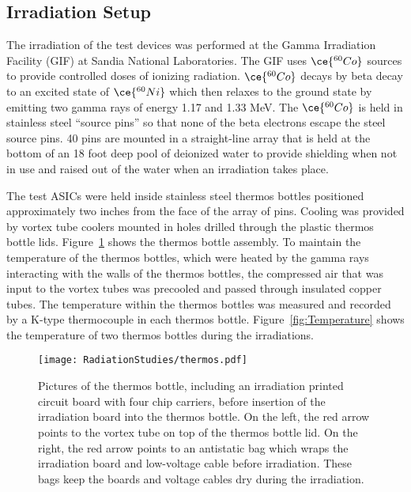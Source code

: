 \subsection{Irradiation Setup}

The irradiation of the test devices was performed at the Gamma Irradiation Facility (GIF) at Sandia National Laboratories.  The GIF uses $\ce{^{60}Co}$ sources to provide controlled doses of ionizing radiation. $\ce{^{60}Co}$ decays by beta decay to an excited state of $\ce{^{60}Ni}$ which then relaxes to the ground state by emitting two gamma rays of energy 1.17 and 1.33 MeV. The $\ce{^{60}Co}$ is held in stainless steel “source pins” so that none of the beta electrons escape the steel source pins. 40 pins are mounted in a straight-line array that is held at the bottom of an 18 foot deep pool of deionized water to provide shielding when not in use and raised out of the water when an irradiation takes place.

The test ASICs were held inside stainless steel thermos bottles positioned approximately two inches from the face of the array of pins. Cooling was provided by vortex tube coolers mounted in holes drilled through the plastic thermos bottle lids. Figure~\ref{fig:Thermos} shows the thermos bottle assembly. To maintain the temperature of the thermos bottles, which were heated by the gamma rays interacting with the walls of the thermos bottles, the compressed air that was input to the vortex tubes was precooled and passed through insulated copper tubes. The temperature within the thermos bottles was measured and recorded by a K-type thermocouple in each thermos bottle. Figure~\ref{fig:Temperature} shows the temperature of two thermos bottles during the irradiations.

\begin{figure}[htbp]
\begin{center}
\texttt{[image: RadiationStudies/thermos.pdf]}
\end{center}
\caption{Pictures of the thermos bottle, including an irradiation printed circuit board with four chip carriers, before insertion of the irradiation board into the thermos bottle. On the left, the red arrow points to the vortex tube on top of the thermos bottle lid. On the right, the red arrow points to an antistatic bag which wraps the irradiation board and low-voltage cable before irradiation. These bags keep the boards and voltage cables dry during the irradiation.}
\label{fig:Thermos}
\end{figure}

